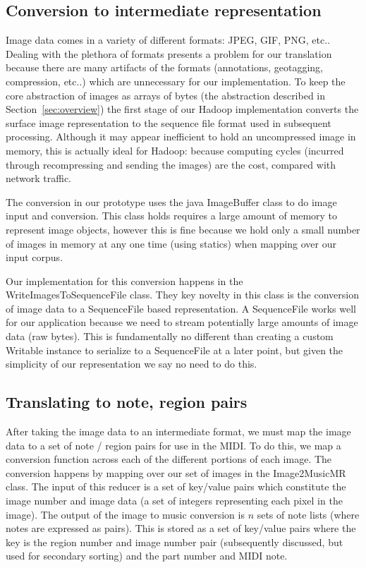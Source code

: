 \documentclass[10pt, conference, compsocconf]{IEEEtran}
\newcommand{\code}[1]{\textsf{\small #1}}
\begin{document}

\subsection{Conversion to intermediate representation}
\label{sec:conversion}
Image data comes in a variety of different formats: JPEG, GIF, PNG,
etc..  Dealing with the plethora of formats presents a problem for our
translation because there are many artifacts of the formats
(annotations, geotagging, compression, etc..) which are unnecessary
for our implementation.  To keep the core abstraction of images as
arrays of bytes (the abstraction described in
Section~\ref{sec:overview}) the first stage of our Hadoop
implementation converts the surface image representation to the
sequence file format used in subsequent processing.  Although it may
appear inefficient to hold an uncompressed image in memory, this is
actually ideal for Hadoop: because computing cycles (incurred through
recompressing and sending the images) are the cost, compared with
network traffic.

The conversion in our prototype uses the java \code{ImageBuffer}
class to do image input and conversion.  This class holds requires a
large amount of memory to represent image objects, however this is
fine because we hold only a small number of images in memory at any
one time (using statics) when mapping over our input corpus.


Our implementation for this conversion happens in the
\code{WriteImagesToSequenceFile} class.  They key novelty in this
class is the conversion of image data to a \code{SequenceFile} based
representation.  A \code{SequenceFile} works well for our application
because we need to stream potentially large amounts of image data (raw
bytes).  This is fundamentally no different than creating a custom
Writable instance to serialize to a \code{SequenceFile} at a later
point, but given the simplicity of our representation we say no need
to do this.

\subsection{Translating to note, region pairs}

After taking the image data to an intermediate format, we must map the
image data to a set of note / region pairs for use in the MIDI.  To do
this, we map a conversion function across each of the different
portions of each image.  The conversion happens by mapping over our
set of images in the \code{Image2MusicMR} class.  The input of this
reducer is a set of key/value pairs which constitute the image number
and image data (a set of integers representing each pixel in the
image).  The output of the image to music conversion is $n$ sets of
note lists (where notes are expressed as pairs).  This is stored as a
set of key/value pairs where the key is the region number and image
number pair (subsequently discussed, but used for secondary sorting)
and the part number and MIDI note.
\end{document}
